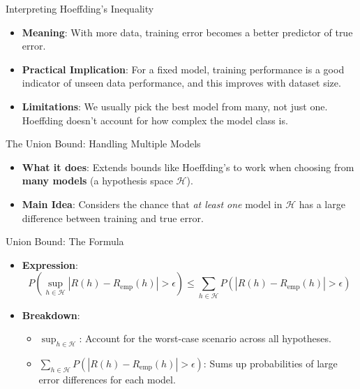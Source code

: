 \documentclass[
  ignorenonframetext,
]{beamer}
\providecommand{\tightlist}{%
  \setlength{\itemsep}{0pt}\setlength{\parskip}{0pt}}\usepackage{longtable,booktabs,array}
\begin{document}
\begin{frame}{Interpreting Hoeffding's Inequality}
\label{interpreting-hoeffdings-inequality}
\begin{itemize}
\tightlist
\item
  \textbf{Meaning}: With more data, training error becomes a better
  predictor of true error.
\item
  \textbf{Practical Implication}: For a fixed model, training
  performance is a good indicator of unseen data performance, and this
  improves with dataset size.
\item
  \textbf{Limitations}: We usually pick the best model from many, not
  just one. Hoeffding doesn't account for how complex the model class
  is.
\end{itemize}
\end{frame}

\begin{frame}{The Union Bound: Handling Multiple Models}
\label{the-union-bound-handling-multiple-models}
\begin{itemize}
\tightlist
\item
  \textbf{What it does}: Extends bounds like Hoeffding's to work when
  choosing from \textbf{many models} (a hypothesis space
  \(\mathcal{H}\)).
\item
  \textbf{Main Idea}: Considers the chance that \emph{at least one}
  model in \(\mathcal{H}\) has a large difference between training and
  true error.
\end{itemize}
\end{frame}

\begin{frame}{Union Bound: The Formula}
\label{union-bound-the-formula}
\begin{itemize}
\tightlist
\item
  \textbf{Expression}: \[
  P\left(\sup_{h \in \mathcal{H}} |R(h) - R_{\text{emp}}(h)| > \epsilon \right) \leq \sum_{h \in \mathcal{H}} P\left(|R(h) - R_{\text{emp}}(h)| > \epsilon \right)
  \]
\item
  \textbf{Breakdown}:

  \begin{itemize}
  \tightlist
  \item
    \(\sup_{h \in \mathcal{H}}\): Account for the worst-case scenario
    across all hypotheses.
  \item
    \(\sum_{h \in \mathcal{H}} P(|R(h) - R_{\text{emp}}(h)| > \epsilon)\):
    Sums up probabilities of large error differences for each model.
  \end{itemize}
\end{itemize}
\end{frame}
\end{document}
